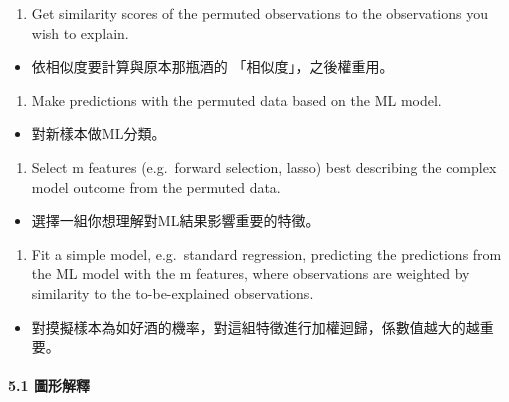 \documentclass[]{book}
\providecommand{\tightlist}{%
  \setlength{\itemsep}{0pt}\setlength{\parskip}{0pt}}
\let\oldparagraph\paragraph
\renewcommand{\paragraph}[1]{\oldparagraph{#1}\mbox{}}
\begin{document}
\begin{enumerate}
\def\labelenumi{\arabic{enumi}.}
\setcounter{enumi}{1}
\tightlist
\item
  Get similarity scores of the permuted observations to the observations you wish to explain.
\end{enumerate}

\begin{itemize}
\tightlist
\item
  依相似度要計算與原本那瓶酒的 「相似度」，之後權重用。
\end{itemize}

\begin{enumerate}
\def\labelenumi{\arabic{enumi}.}
\setcounter{enumi}{2}
\tightlist
\item
  Make predictions with the permuted data based on the ML model.
\end{enumerate}

\begin{itemize}
\tightlist
\item
  對新樣本做ML分類。
\end{itemize}

\begin{enumerate}
\def\labelenumi{\arabic{enumi}.}
\setcounter{enumi}{3}
\tightlist
\item
  Select m features (e.g.~forward selection, lasso) best describing the complex model outcome from the permuted data.
\end{enumerate}

\begin{itemize}
\tightlist
\item
  選擇一組你想理解對ML結果影響重要的特徵。
\end{itemize}

\begin{enumerate}
\def\labelenumi{\arabic{enumi}.}
\setcounter{enumi}{4}
\tightlist
\item
  Fit a simple model, e.g.~standard regression, predicting the predictions from the ML model with the m features, where observations are weighted by similarity to the to-be-explained observations.
\end{enumerate}

\begin{itemize}
\tightlist
\item
  對摸擬樣本為如好酒的機率，對這組特徵進行加權迴歸，係數值越大的越重要。
\end{itemize}

\paragraph{5.1 圖形解釋}
\end{document}
